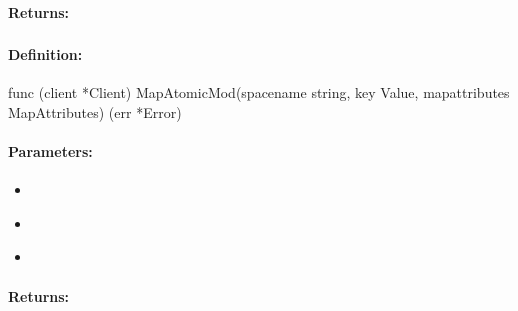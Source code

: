 \paragraph{Returns:}


\pagebreak
\subsubsection{}
\label{api:Go:MapAtomicMod}


\paragraph{Definition:}
\begin{gocode}
func (client *Client) MapAtomicMod(spacename string, key Value, mapattributes MapAttributes) (err *Error)
\end{gocode}

\paragraph{Parameters:}
\begin{itemize}[noitemsep]
\item {}\\

\item {}\\

\item {}\\

\end{itemize}

\paragraph{Returns:}


\pagebreak
\subsubsection{}
\label{api:Go:CondMapAtomicMod}


